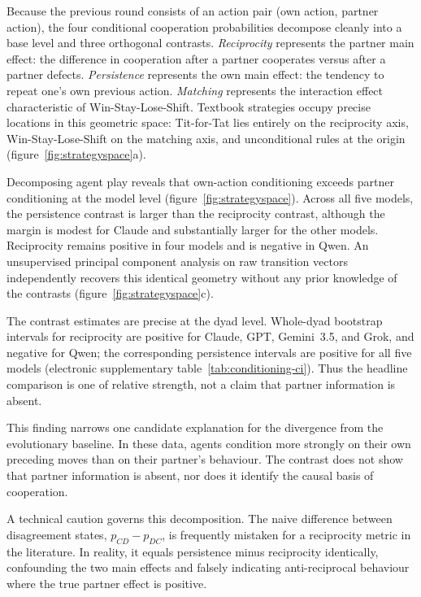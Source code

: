\documentclass[11pt,a4paper]{article}
\begin{document}
Because the previous round consists of an action pair (own action, partner
action), the four conditional cooperation probabilities decompose cleanly into
a base level and three orthogonal contrasts. \emph{Reciprocity} represents the
partner main effect: the difference in cooperation after a partner cooperates
versus after a partner defects. \emph{Persistence} represents the own main
effect: the tendency to repeat one's own previous action. \emph{Matching}
represents the interaction effect characteristic of Win-Stay-Lose-Shift.
Textbook strategies occupy precise locations in this geometric space: Tit-for-Tat
lies entirely on the reciprocity axis, Win-Stay-Lose-Shift on the matching axis,
and unconditional rules at the origin (figure~\ref{fig:strategyspace}a).

Decomposing agent play reveals that own-action conditioning exceeds partner
conditioning at the model level (figure~\ref{fig:strategyspace}). Across all
five models, the persistence contrast is larger than the reciprocity contrast,
although the margin is modest for Claude and substantially larger for the other
models. Reciprocity remains positive in four models and is negative in Qwen. An
unsupervised principal component analysis on raw transition
vectors independently recovers this identical geometry without any prior
knowledge of the contrasts (figure~\ref{fig:strategyspace}c).

The contrast estimates are precise at the dyad level. Whole-dyad bootstrap
intervals for reciprocity are positive for Claude, GPT, Gemini~3.5, and Grok,
and negative for Qwen; the corresponding persistence intervals are positive for
all five models (electronic supplementary table~\ref{tab:conditioning-ci}). Thus the
headline comparison is one of relative strength, not a claim that partner
information is absent.

This finding narrows one candidate explanation for the divergence from the
evolutionary baseline. In these data, agents condition more strongly on their
own preceding moves than on their partner's behaviour. The contrast does not
show that partner information is absent, nor does it identify the causal basis
of cooperation.

A technical caution governs this decomposition. The naive difference between
disagreement states, $p_{CD} - p_{DC}$, is frequently mistaken for a reciprocity
metric in the literature. In reality, it equals persistence minus reciprocity
identically, confounding the two main effects and falsely indicating
anti-reciprocal behaviour where the true partner effect is positive.
\end{document}
